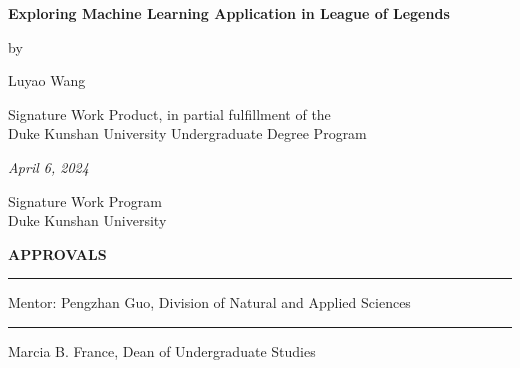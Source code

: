 \documentclass[11pt,a4paper,oneside]{report}
\begin{document}
\newcommand{\authorname}{Luyao Wang}

\newcommand{\thetitle}{Exploring Machine Learning Application in League of Legends}

\newcommand{\submissiondate}{April 6, 2024}

\newcommand{\mentor}{Pengzhan Guo}

\newcommand{\academicunit}{Division of Natural and Applied Sciences}



\begin{titlepage}

  \vspace*{\bigskipamount}

  \begin{center}
    {\sffamily\LARGE\bfseries\MakeUppercase\thetitle\par}

    \bigskip

    by

    \bigskip

    {\Large \authorname}

    \bigskip

    Signature Work Product, in partial fulfillment of the \\
    Duke Kunshan University Undergraduate Degree Program

    \bigskip

    \emph{\submissiondate}

    \bigskip

    Signature Work Program \\
    Duke Kunshan University

  \end{center}

  \vfill

  \textbf{\textsf{APPROVALS}}

  \bigskip\bigskip\bigskip
  \hrule

  Mentor: \mentor, \academicunit

  \bigskip\bigskip\bigskip
  \hrule

  Marcia B. France, Dean of Undergraduate Studies

\end{titlepage}
\end{document}
